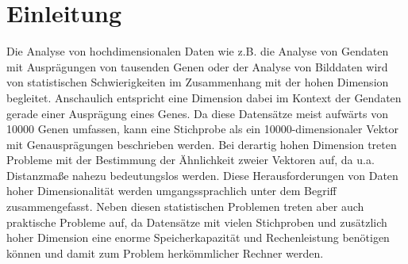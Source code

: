 \chapter{Einleitung}
\label{ch:Enleitung}

Die Analyse von hochdimensionalen Daten wie z.B. die Analyse von Gendaten mit Ausprägungen von
tausenden Genen \parencite[siehe z.B.][]{Parmigiani.2003} oder der Analyse von Bilddaten wird von statistischen
Schwierigkeiten im Zusammenhang mit der hohen Dimension begleitet. Anschaulich entspricht eine
Dimension dabei im Kontext der Gendaten gerade einer Ausprägung eines Genes. Da diese Datensätze
meist aufwärts von \num{10000} Genen umfassen, kann eine Stichprobe als ein
\num{10000}-dimensionaler Vektor mit Genausprägungen beschrieben werden. Bei derartig hohen
Dimension treten Probleme mit der Bestimmung der Ähnlichkeit zweier Vektoren auf, da u.a.
Distanzmaße nahezu bedeutungslos werden. Diese Herausforderungen von Daten hoher Dimensionalität
werden umgangssprachlich unter dem Begriff  \parencite{Bellman.1961} zusammengefasst. Neben diesen statistischen Problemen treten aber auch
praktische Probleme auf, da Datensätze mit vielen Stichproben und zusätzlich hoher Dimension eine
enorme Speicherkapazität und Rechenleistung benötigen können und damit zum Problem herkömmlicher
Rechner werden.

